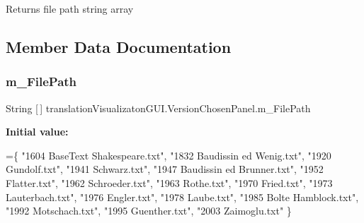 \begin{DoxyReturn}{Returns}
file path string array 
\end{DoxyReturn}


\subsection{Member Data Documentation}
\mbox{\label{classtranslation_visualizaton_g_u_i_1_1_version_chosen_panel_afde1444266b2eccb015a29fb5fe66b89}} 
\subsubsection{\texorpdfstring{m\+\_\+\+File\+Path}{m\_FilePath}}
{\footnotesize\ttfamily String \mbox{[}$\,$\mbox{]} translation\+Visualizaton\+G\+U\+I.\+Version\+Chosen\+Panel.\+m\+\_\+\+File\+Path}

{\bfseries Initial value\+:}
\begin{DoxyCode}
=\{ \textcolor{stringliteral}{"1604 BaseText Shakespeare.txt"}, \textcolor{stringliteral}{"1832 Baudissin ed Wenig.txt"}, \textcolor{stringliteral}{"1920 Gundolf.txt"}, \textcolor{stringliteral}{"1941 Schwarz.txt"},
            \textcolor{stringliteral}{"1947 Baudissin ed Brunner.txt"},    \textcolor{stringliteral}{"1952 Flatter.txt"}, \textcolor{stringliteral}{"1962 Schroeder.txt"},
            \textcolor{stringliteral}{"1963 Rothe.txt"}, \textcolor{stringliteral}{"1970 Fried.txt"}, \textcolor{stringliteral}{"1973 Lauterbach.txt"},
            \textcolor{stringliteral}{"1976 Engler.txt"}, \textcolor{stringliteral}{"1978 Laube.txt"}, \textcolor{stringliteral}{"1985 Bolte Hamblock.txt"},
            \textcolor{stringliteral}{"1992 Motschach.txt"}, \textcolor{stringliteral}{"1995 Guenther.txt"}, \textcolor{stringliteral}{"2003 Zaimoglu.txt"} \}
\end{DoxyCode}
\mbox{\label{classtranslation_visualizaton_g_u_i_1_1_version_chosen_panel_a886df3a3c3c1d8bd15320d84972fa518}} 
